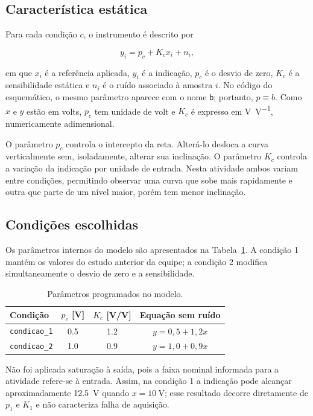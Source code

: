 \documentclass[12pt,a4paper]{article}
\newcommand{\condum}{\texttt{condicao\_1}}
\newcommand{\conddois}{\texttt{condicao\_2}}
\begin{document}
\subsection{Característica estática}

Para cada condição $c$, o instrumento é descrito por

\begin{equation}
  y_i = p_c + K_c x_i + n_i,
  \label{eq:modelo}
\end{equation}

em que $x_i$ é a referência aplicada, $y_i$ é a indicação, $p_c$ é o desvio de zero, $K_c$ é a sensibilidade estática e $n_i$ é o ruído associado à amostra $i$. No código do esquemático, o mesmo parâmetro aparece com o nome \texttt{b}; portanto, $p\equiv b$. Como $x$ e $y$ estão em volts, $p_c$ tem unidade de volt e $K_c$ é expresso em \si{\volt\per\volt}, numericamente adimensional.

O parâmetro $p_c$ controla o intercepto da reta. Alterá-lo desloca a curva verticalmente sem, isoladamente, alterar sua inclinação. O parâmetro $K_c$ controla a variação da indicação por unidade de entrada. Nesta atividade ambos variam entre condições, permitindo observar uma curva que sobe mais rapidamente e outra que parte de um nível maior, porém tem menor inclinação.

\subsection{Condições escolhidas}

Os parâmetros internos do modelo são apresentados na Tabela~\ref{tab:parametros}. A condição 1 mantém os valores do estudo anterior da equipe; a condição 2 modifica simultaneamente o desvio de zero e a sensibilidade.

\begin{table}[H]
  \centering
  \caption{Parâmetros programados no modelo.}
  \label{tab:parametros}
  \begin{tabular}{lccc}
    \toprule
    Condição & $p_c$ [V] & $K_c$ [V/V] & Equação sem ruído \\
    \midrule
    \condum & \num{0.5} & \num{1.2} & $y=0{,}5+1{,}2x$ \\
    \conddois & \num{1.0} & \num{0.9} & $y=1{,}0+0{,}9x$ \\
    \bottomrule
  \end{tabular}
\end{table}

Não foi aplicada saturação à saída, pois a faixa nominal informada para a atividade refere-se à entrada. Assim, na condição 1 a indicação pode alcançar aproximadamente \SI{12.5}{\volt} quando $x=\SI{10}{\volt}$; esse resultado decorre diretamente de $p_1$ e $K_1$ e não caracteriza falha de aquisição.
\end{document}
